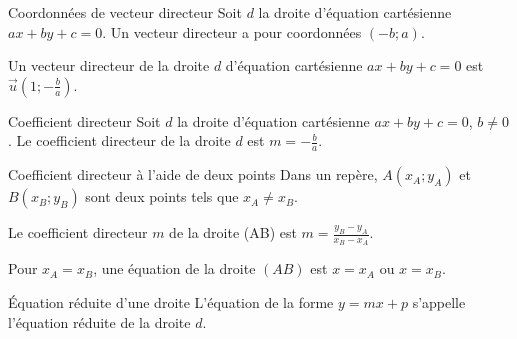 \begin{ThT}{Coordonnées de vecteur directeur}
Soit $d$ la droite d'équation cartésienne $ax+by+c =0$. Un vecteur directeur a pour coordonnées $(-b;a)$.
\end{ThT}






\begin{Rq} 
Un vecteur directeur de la droite $d$ d'équation cartésienne $ax+by+c =0$ est $\overrightarrow{u}\left(1;-\frac{b}{a}\right)$.
\end{Rq}



\begin{ThT}{Coefficient directeur}
Soit $d$ la droite d'équation cartésienne $ax+by+c =0$, $b\neq 0$. Le coefficient directeur de la droite $d$ est $m=-\frac{b}{a}$.
\end{ThT}




\begin{ThT}{Coefficient directeur à l'aide de deux points} 
Dans un repère, $A(x_A;y_A)$ et $B(x_B;y_B)$ sont deux points tels que $x_A \neq x_B$.

Le coefficient directeur $m$ de la droite (AB) est $ m = \frac{y_B-y_A}{x_B-x_A}$.

Pour  $x_A = x_B$, une équation de la droite $(AB)$ est $x=x_A$ ou $x=x_B$.
\end{ThT}








\begin{ThT}{Équation réduite d'une droite}
L'équation de la forme $y=mx+p$ s'appelle l'équation réduite de la droite $d$.
\end{ThT}










